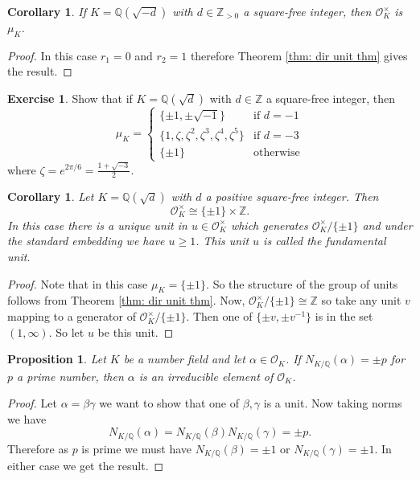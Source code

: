 \documentclass[11pt,a4paper]{report}
\theoremstyle{plain}
\newtheorem{cor}[subsection]{Corollary}
\newtheorem{prop}[subsection]{Proposition}
\theoremstyle{definition}
\theoremstyle{definition}
\newtheorem{question}[subsection]{Exercise}
\newcommand{\ZZ}{\mathbb{Z}}
\def\QQ{\mathbb{Q}}
\def \Nm {N_{K/\QQ}}
\def \a{\alpha}
\def \OO {\mathcal{O}}
\begin{document}
\begin{cor}
If $K=\QQ(\sqrt{-d})$ with $d \in \ZZ_{> 0}$ a square-free integer, then $\OO_K^\times$ is  $\mu_K$.
\end{cor}

\begin{proof}
In this case $r_1=0$ and $r_2=1$ therefore Theorem \ref{thm: dir unit thm} gives the result.
\end{proof}


\begin{question}\label{ques: units in img quad}
Show that if $K=\QQ(\sqrt{d})$ with $d \in \ZZ$ a square-free integer, then \[
{\mu_K=} \begin{cases} \{\pm 1, \pm \sqrt{-1}\} & \text{if } d=-1\\
	\{1, \zeta, \zeta^2, \zeta^3, \zeta^4, \zeta^5  \} & \text{if } d=-3\\
	\{\pm 1\} & \text{otherwise}
\end{cases}\]
where $\zeta=e^{2\pi/6}=\frac{1+\sqrt{-3}}{2}$.
\end{question}

\begin{cor}
Let $K=\QQ(\sqrt{d})$ with $d$ a positive square-free integer. Then \[\OO_K^{\times} \cong \{\pm 1\} \times \ZZ.\] In this case there is a unique unit in $u \in \OO_K^{\times}$ which generates $\OO_K^\times/ \{\pm 1\}$ and under the standard embedding we have $u \geq 1$. This unit $u$ is called the fundamental unit.
\end{cor}

\begin{proof}
Note that in this case $\mu_K=\{\pm 1\}$. So the structure of the group of units follows from Theorem \ref{thm: dir unit thm}. Now, $\OO_{K}^{\times}/\{\pm 1\} \cong \ZZ$ so take any unit $v$ mapping to a generator of  $\OO_{K}^{\times}/\{\pm 1\}$. Then one of $\{\pm v, \pm v^{-1}\}$  is in the set $(1,\infty)$. So let $u$ be this unit.
\end{proof}







\begin{prop}
Let $K$ be a number field and let $\a \in \OO_K$. If $N_{K/\QQ}(\a)=\pm p$ for $p$ a prime number, then $\a$ is an irreducible element of $\OO_K$.
\end{prop}

\begin{proof}
Let $\a=\beta \gamma$ we want to show that one of $\beta,\gamma$ is a unit. Now taking norms we have \[\Nm(\a)=\Nm(\beta)\Nm(\gamma)=\pm p. \] Therefore as $p$ is prime we must have $\Nm(\beta)=\pm 1$ or $\Nm(\gamma)=\pm 1$. In either case we get the result. 
\end{proof}
\end{document}

